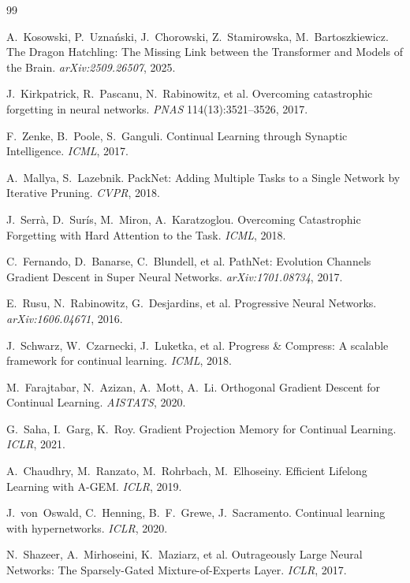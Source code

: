\documentclass[11pt]{article}
\theoremstyle{definition}\newtheorem{definition}{Definition}
\theoremstyle{remark}\newtheorem{remark}{Remark}
\begin{document}
\begin{thebibliography}{99}\small

A.~Kosowski, P.~Uzna\'nski, J.~Chorowski, Z.~Stamirowska, M.~Bartoszkiewicz.
\newblock The Dragon Hatchling: The Missing Link between the Transformer and Models of the
Brain.
\newblock \emph{arXiv:2509.26507}, 2025.

J.~Kirkpatrick, R.~Pascanu, N.~Rabinowitz, et al.
\newblock Overcoming catastrophic forgetting in neural networks.
\newblock \emph{PNAS} 114(13):3521--3526, 2017.

F.~Zenke, B.~Poole, S.~Ganguli.
\newblock Continual Learning through Synaptic Intelligence.
\newblock \emph{ICML}, 2017.

A.~Mallya, S.~Lazebnik.
\newblock PackNet: Adding Multiple Tasks to a Single Network by Iterative Pruning.
\newblock \emph{CVPR}, 2018.

J.~Serr\`a, D.~Sur\'is, M.~Miron, A.~Karatzoglou.
\newblock Overcoming Catastrophic Forgetting with Hard Attention to the Task.
\newblock \emph{ICML}, 2018.

C.~Fernando, D.~Banarse, C.~Blundell, et al.
\newblock PathNet: Evolution Channels Gradient Descent in Super Neural Networks.
\newblock \emph{arXiv:1701.08734}, 2017.

E.~Rusu, N.~Rabinowitz, G.~Desjardins, et al.
\newblock Progressive Neural Networks.
\newblock \emph{arXiv:1606.04671}, 2016.

J.~Schwarz, W.~Czarnecki, J.~Luketka, et al.
\newblock Progress \& Compress: A scalable framework for continual learning.
\newblock \emph{ICML}, 2018.

M.~Farajtabar, N.~Azizan, A.~Mott, A.~Li.
\newblock Orthogonal Gradient Descent for Continual Learning.
\newblock \emph{AISTATS}, 2020.

G.~Saha, I.~Garg, K.~Roy.
\newblock Gradient Projection Memory for Continual Learning.
\newblock \emph{ICLR}, 2021.

A.~Chaudhry, M.~Ranzato, M.~Rohrbach, M.~Elhoseiny.
\newblock Efficient Lifelong Learning with A-GEM.
\newblock \emph{ICLR}, 2019.

J.~von~Oswald, C.~Henning, B.~F.~Grewe, J.~Sacramento.
\newblock Continual learning with hypernetworks.
\newblock \emph{ICLR}, 2020.

N.~Shazeer, A.~Mirhoseini, K.~Maziarz, et al.
\newblock Outrageously Large Neural Networks: The Sparsely-Gated Mixture-of-Experts Layer.
\newblock \emph{ICLR}, 2017.


\end{thebibliography}
\end{document}
